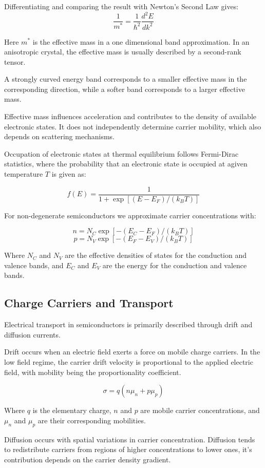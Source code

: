 \documentclass[letterpaper, 10pt, conference]{ieeeconf}
\begin{document}
Differentiating and comparing the result with Newton's Second Law gives:
$$ \frac{1}{m^*}=\frac{1}{\hbar^2}\frac{d^2 E}{dk^2} $$

Here $m^*$ is the effective mass in a one dimensional band approximation. In an anisotropic crystal, the effective mass is usually described by a second-rank tensor.

A strongly curved energy band corresponds to a smaller effective mass in the corresponding direction, while a softer band corresponds to a larger effective mass.

Effective mass influences acceleration and contributes to the density of available electronic states. It does not independently determine carrier mobility, which also depends on scattering mechanisms.


Occupation of electronic states at thermal equilibrium follows Fermi-Dirac statistics, where the probability that an electronic state is occupied at agiven temperature $T$ is given as:

$$ f(E)=\frac{1}{1+\exp[(E-E_F)/(k_BT)]} $$

For non-degenerate semiconductors we approximate carrier concentrations with:

$$ n = N_C \exp{[-(E_C-E_F)/(k_BT)]} $$
$$ p = N_V \exp{[-(E_F-E_V)/(k_BT)]} $$

Where $N_C$ and $N_V$ are the effective densities of states for the conduction and valence bands, and $E_C$ and $E_V$ are the energy for the conduction and valence bands.

\subsection{Charge Carriers and Transport}

Electrical transport in semiconductors is primarily described through drift and diffusion currents.

Drift occurs when an electric field exerts a force on mobile charge carriers. In the low field regime, the carrier drift velocity is proportional to the applied electric field, with mobility being the proportionality coefficient.

$$ \sigma=q(n\mu_n+p\mu_p) $$

Where $q$ is the elementary charge, $n$ and $p$ are mobile carrier concentrations, and $\mu_n$ and $\mu_p$ are their corresponding mobilities.

Diffusion occurs with spatial variations in carrier concentration. Diffusion tends to redistribute carriers from regions of higher concentrations to lower ones, it's contribution depends on the carrier density gradient.
\end{document}
